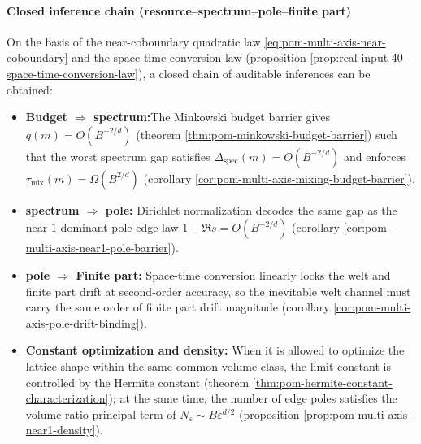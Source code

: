 \paragraph{Closed inference chain (resource--spectrum--pole--finite part)}
On the basis of the near-coboundary quadratic law \eqref{eq:pom-multi-axis-near-coboundary} and the space-time conversion law (proposition \ref{prop:real-input-40-space-time-conversion-law}), a closed chain of auditable inferences can be obtained:
\begin{itemize}
\item \textbf{Budget \(\Rightarrow\) spectrum:}The Minkowski budget barrier gives \(q(m)=O(B^{-2/d})\) (theorem \ref{thm:pom-minkowski-budget-barrier}) such that the worst spectrum gap satisfies \(\Delta_{\mathrm{spec}}(m)=O(B^{-2/d})\) and enforces \(\tau_{\mathrm{mix}}(m)=\Omega(B^{2/d})\) (corollary \ref{cor:pom-multi-axis-mixing-budget-barrier}).
\item \textbf{spectrum \(\Rightarrow\) pole:} Dirichlet normalization decodes the same gap as the near-\(1\) dominant pole edge law \(1-\Re s=O(B^{-2/d})\) (corollary \ref{cor:pom-multi-axis-near1-pole-barrier}).
\item \textbf{pole \(\Rightarrow\) Finite part:} Space-time conversion linearly locks the welt and finite part drift at second-order accuracy, so the inevitable welt channel must carry the same order of finite part drift magnitude (corollary \ref{cor:pom-multi-axis-pole-drift-binding}).
\item \textbf{Constant optimization and density:} When it is allowed to optimize the lattice shape within the same common volume class, the limit constant is controlled by the Hermite constant (theorem \ref{thm:pom-hermite-constant-characterization}); at the same time, the number of edge poles satisfies the volume ratio principal term of \(N_\varepsilon\sim B\varepsilon^{d/2}\) (proposition \ref{prop:pom-multi-axis-near1-density}).
\end{itemize}


